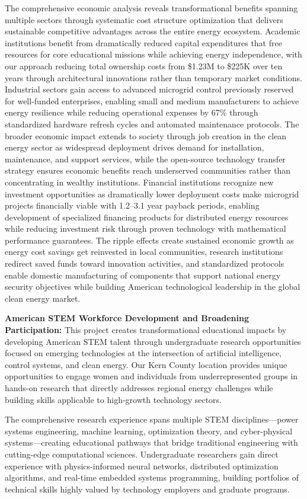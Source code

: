 \documentclass[12pt]{article}
\begin{document}
The comprehensive economic analysis reveals transformational benefits spanning multiple sectors through systematic cost structure optimization that delivers sustainable competitive advantages across the entire energy ecosystem. Academic institutions benefit from dramatically reduced capital expenditures that free resources for core educational missions while achieving energy independence, with our approach reducing total ownership costs from \$1.23M to \$225K over ten years through architectural innovations rather than temporary market conditions. Industrial sectors gain access to advanced microgrid control previously reserved for well-funded enterprises, enabling small and medium manufacturers to achieve energy resilience while reducing operational expenses by 67\% through standardized hardware refresh cycles and automated maintenance protocols. The broader economic impact extends to society through job creation in the clean energy sector as widespread deployment drives demand for installation, maintenance, and support services, while the open-source technology transfer strategy ensures economic benefits reach underserved communities rather than concentrating in wealthy institutions. Financial institutions recognize new investment opportunities as dramatically lower deployment costs make microgrid projects financially viable with 1.2--3.1 year payback periods, enabling development of specialized financing products for distributed energy resources while reducing investment risk through proven technology with mathematical performance guarantees. The ripple effects create sustained economic growth as energy cost savings get reinvested in local communities, research institutions redirect saved funds toward innovation activities, and standardized protocols enable domestic manufacturing of components that support national energy security objectives while building American technological leadership in the global clean energy market.

\textbf{American STEM Workforce Development and Broadening Participation:} This project creates transformational educational impacts by developing American STEM talent through undergraduate research opportunities focused on emerging technologies at the intersection of artificial intelligence, control systems, and clean energy. Our Kern County location provides unique opportunities to engage women and individuals from underrepresented groups in hands-on research that directly addresses regional energy challenges while building skills applicable to high-growth technology sectors.

The comprehensive research experience spans multiple STEM disciplines---power systems engineering, machine learning, optimization theory, and cyber-physical systems---creating educational pathways that bridge traditional engineering with cutting-edge computational sciences. Undergraduate researchers gain direct experience with physics-informed neural networks, distributed optimization algorithms, and real-time embedded systems programming, building portfolios of technical skills highly valued by technology employers and graduate programs.





\end{document}
